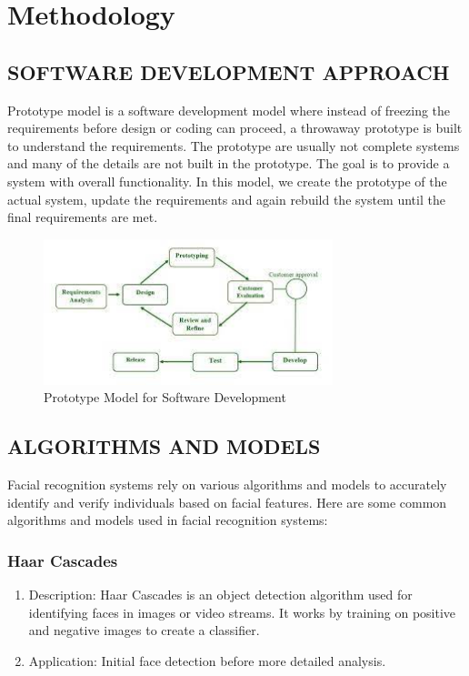 \chapter{Methodology}
 \section{SOFTWARE DEVELOPMENT APPROACH}
Prototype model is a software development model where instead of freezing the
requirements before design or coding can proceed, a throwaway prototype is built to
understand the requirements. The prototype are usually not complete systems and many
of the details are not built in the prototype. The goal is to provide a system with overall
functionality. In this model, we create the prototype of the actual system, update the
requirements and again rebuild the system until the final requirements are met.
       
 \begin{figure}[hbt]
            \centering
                \includegraphics[width=0.75\textwidth]{Images/softwarereq.jpg}
                \caption{Prototype Model for Software Development}
        \end{figure}
    
        \section{ALGORITHMS AND MODELS}
        
Facial recognition systems rely on various algorithms and models to accurately identify and verify individuals based on facial features. Here are some common algorithms and models used in facial recognition systems:

\subsection{Haar Cascades}
\begin{enumerate}
    \item Description: Haar Cascades is an object detection algorithm used for identifying faces in images or video streams. It works by training on positive and negative images to create a classifier.
\item Application: Initial face detection before more detailed analysis.
\end{enumerate}

